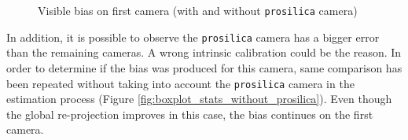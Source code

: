 \begin{figure}[!htbp]
 \centering
 \caption{Visible bias on first camera (with and without \texttt{prosilica} camera)}
\end{figure}

In addition, it is possible to observe the \texttt{prosilica} camera has a bigger error than the remaining cameras. A wrong intrinsic calibration could be the reason. In order to determine if the bias was produced for this camera, same comparison has been repeated without taking into account the \texttt{prosilica} camera in the estimation process (Figure \ref{fig:boxplot_stats_without_prosilica}). Even though the global re-projection improves in this case, the bias continues on the first camera.




